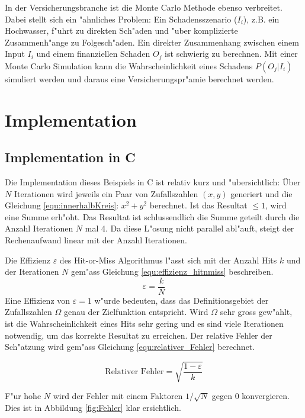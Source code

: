 \begin{refsection}
In der Versicherungsbranche ist die Monte Carlo Methode ebenso
verbreitet. Dabei stellt sich ein "ahnliches Problem: Ein Schadensszenario
($I_i$), z.B. ein Hochwasser, f"uhrt zu direkten Sch"aden und "uber
komplizierte Zusammenh"ange zu Folgesch"aden. Ein direkter Zusammenhang
zwischen einem Input $I_i$ und einem finanziellen Schaden $O_j$ ist
schwierig zu berechnen. Mit einer Monte Carlo Simulation kann die
Wahrscheinlichkeit eines Schadens $P(O_j | I_i)$ simuliert werden und
daraus eine Versicherungspr"amie berechnet werden.



\section{Implementation}
\subsection{Implementation in C}
Die Implementation dieses Beispiels in C ist relativ kurz und
"ubersichtlich: Über $N$ Iterationen wird jeweils ein Paar von
Zufallszahlen $(x,y)$ generiert und die Gleichung
\ref{equ:innerhalbKreis}: $x^2 + y^2$ berechnet. Ist das Resultat $\leq1$,
wird eine Summe erh"oht. Das Resultat ist schlussendlich die Summe geteilt
durch die Anzahl Iterationen $N$ mal 4. Da diese L"osung nicht parallel
abl"auft, steigt der Rechenaufwand linear mit der Anzahl Iterationen.

Die Effizienz $\varepsilon$ des Hit-or-Miss Algorithmus l"asst sich
mit der Anzahl Hits $k$ und der Iterationen $N$ gem"ass Gleichung
\ref{equ:effizienz_hitnmiss} beschreiben.
\begin{equation}
	\varepsilon = \frac{k}{N}
	\label{equ:effizienz_hitnmiss}
\end{equation} 
Eine Effizienz von $\varepsilon=1$ w"urde bedeuten, dass das
Definitionsgebiet der Zufallszahlen $\Omega$ genau der Zielfunktion
entspricht. Wird $\Omega$ sehr gross gew"ahlt, ist die Wahrscheinlichkeit
eines Hits sehr gering und es sind viele Iterationen notwendig, um das
korrekte Resultat zu erreichen. Der relative Fehler der Sch"atzung wird
gem"ass Gleichung \ref{equ:relativer_Fehler} berechnet.

\begin{equation}
	\text{Relativer Fehler} = \sqrt{\frac{1-\varepsilon}{k}} 
	\label{equ:relativer_Fehler}
\end{equation}

F"ur hohe $N$ wird der Fehler mit einem Faktoren $1 / \sqrt{N}$ gegen $0$
konvergieren. Dies ist in Abbildung \ref{fig:Fehler} klar ersichtlich.


\end{refsection}
